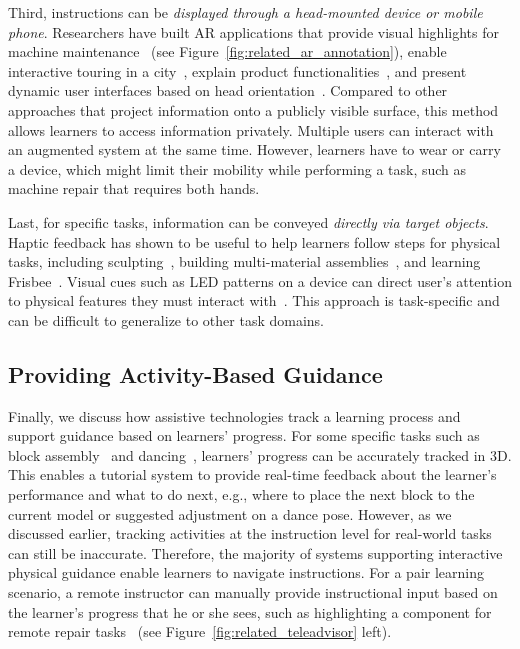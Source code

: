 Third, instructions can be \emph{displayed through a head-mounted device or mobile phone}. Researchers have built AR applications that provide visual highlights for machine maintenance~\cite{Henderson:2011ff,Mohr:2015:RTD:2702123.2702490} (see Figure~\ref{fig:related_ar_annotation}), enable interactive touring in a city~\cite{Feiner1997}, explain product functionalities~\cite{MagicLens}, and present dynamic user interfaces based on head orientation~\cite{Zhang:2014:HHO:2659766.2659773}.
%
Compared to other approaches that project information onto a publicly visible surface, this method allows learners to access information privately. Multiple users can interact with an augmented system at the same time. However, learners have to wear or carry a device, which might limit their mobility while performing a task, such as machine repair that requires both hands.

Last, for specific tasks, information can be conveyed \emph{directly via target objects}. Haptic feedback has shown to be useful to help learners follow steps for physical tasks, including sculpting~\cite{Zoran:2013:FFD:2470654.2481361,Agrawal:2015:PPS:2807442.2807505}, building multi-material assemblies~\cite{Schoop:2016:DSS:2851581.2892429}, and learning Frisbee~\cite{Solomon:2014:UTI:2540930.2540965}. Visual cues such as LED patterns on a device can direct user's attention to physical features they must interact with~\cite{Solomon:2014:UTI:2540930.2540965,Vasey:2016:HHR:2897839.2927404}.
%
This approach is task-specific and can be difficult to generalize to other task domains.

\subsection{Providing Activity-Based Guidance}
Finally, we discuss how assistive technologies track a learning process and support guidance based on learners' progress. For some specific tasks such as block assembly~\cite{Gupta2012DuploTrack,Wu:2016:ARI:2856400.2856416} and dancing~\cite{Anderson:2013:YEM:2501988.2502045}, learners' progress can be accurately tracked in 3D. This enables a tutorial system to provide real-time feedback about the learner's performance and what to do next, e.g., where to place the next block to the current model or suggested adjustment on a dance pose.
%
However, as we discussed earlier, tracking activities at the instruction level for real-world tasks can still be inaccurate. Therefore, the majority of systems supporting interactive physical guidance enable learners to navigate instructions.
%
For a pair learning scenario, a remote instructor can manually provide instructional input based on the learner's progress that he or she sees, such as highlighting a component for remote repair tasks~\cite{Gurevich:2012ko,Kirk:2006:CRG:1124772.1124951} (see Figure~\ref{fig:related_teleadvisor} left).

